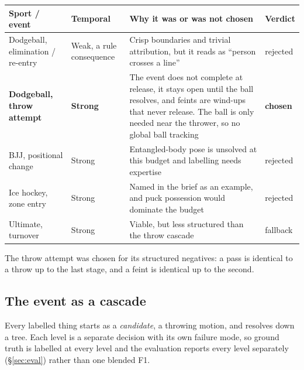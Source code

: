 \documentclass[10pt,a4paper]{article}
\begin{document}
{\footnotesize
\begin{xltabular}{\textwidth}{L{34mm} L{26mm} X l}
\toprule
\textbf{Sport / event} & \textbf{Temporal} & \textbf{Why it was or was not chosen} & \textbf{Verdict}\\
\midrule
Dodgeball, elimination / re-entry & Weak, a rule consequence & Crisp boundaries and trivial attribution, but it reads as ``person crosses a line'' & rejected\\
\textbf{Dodgeball, throw attempt} & \textbf{Strong} & The event does not complete at release, it stays open until the ball resolves, and feints are wind-ups that never release. The ball is only needed near the thrower, so no global ball tracking & \textbf{chosen}\\
BJJ, positional change & Strong & Entangled-body pose is unsolved at this budget and labelling needs expertise & rejected\\
Ice hockey, zone entry & Strong & Named in the brief as an example, and puck possession would dominate the budget & rejected\\
Ultimate, turnover & Strong & Viable, but less structured than the throw cascade & fallback\\
\bottomrule
\end{xltabular}}

The throw attempt was chosen for its structured negatives: a pass is identical to a throw
up to the last stage, and a feint is identical up to the second.

\subsection{The event as a cascade}

Every labelled thing starts as a \emph{candidate}, a throwing motion, and resolves down a
tree. Each level is a separate decision with its own failure mode, so ground truth is
labelled at every level and the evaluation reports every level separately
(\S\ref{sec:eval}) rather than one blended F1.
\end{document}
